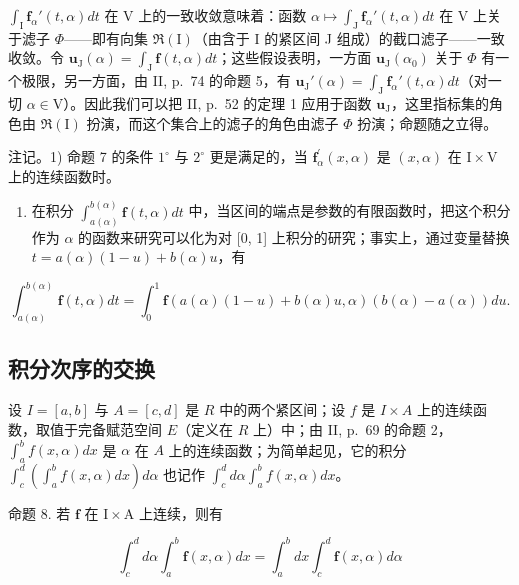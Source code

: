 \(\int_{\mathrm{I}} \mathbf{f}_{\alpha}'(t, \alpha) dt\) 在 V 上的一致收敛意味着：函数 \(\alpha \mapsto \int_{\mathrm{J}} \mathbf{f}_{\alpha}'(t, \alpha) dt\) 在 V 上关于滤子 \(\Phi\)——即有向集 \(\Re(\mathrm{I})\)（由含于 I 的紧区间 J 组成）的截口滤子——一致收敛。令 \(\mathbf{u}_{\mathrm{J}}(\alpha) = \int_{\mathrm{J}} \mathbf{f}(t, \alpha) dt\)；这些假设表明，一方面 \(\mathbf{u}_{\mathrm{J}}(\alpha_0)\) 关于 \(\Phi\) 有一个极限，另一方面，由 II, p.~74 的命题 5，有 \(\mathbf{u}_{\mathrm{J}}'(\alpha) = \int_{\mathrm{J}} \mathbf{f}_{\alpha}'(t, \alpha) dt\)（对一切 \(\alpha \in \mathrm{V}\)）。因此我们可以把 II, p.~52 的定理 1 应用于函数 \(\mathbf{u}_{\mathrm{J}}\)，这里指标集的角色由 \(\Re(\mathrm{I})\) 扮演，而这个集合上的滤子的角色由滤子 \(\Phi\) 扮演；命题随之立得。

注记。1) 命题 7 的条件 \(1^{\circ}\) 与 \(2^{\circ}\) 更是满足的，当 \(\mathbf{f}_{\alpha}^{\prime}(x,\alpha)\) 是 \((x,\alpha)\) 在 \(\mathrm{I} \times \mathrm{V}\) 上的连续函数时。

\begin{enumerate}
\def\labelenumi{\arabic{enumi})}
\setcounter{enumi}{1}
\tightlist
\item
  在积分 \(\int_{a(\alpha)}^{b(\alpha)}\mathbf{f}(t,\alpha)dt\) 中，当区间的端点是参数的有限函数时，把这个积分作为 \(\alpha\) 的函数来研究可以化为对 {[}0, 1{]} 上积分的研究；事实上，通过变量替换 \(t = a(\alpha)(1 - u) + b(\alpha)u\)，有
\end{enumerate}

\[
\int_ {a (\alpha)} ^ {b (\alpha)} \mathbf {f} (t, \alpha) d t = \int_ {0} ^ {1} \mathbf {f} (a (\alpha) (1 - u) + b (\alpha) u, \alpha) (b (\alpha) - a (\alpha)) d u.
\]

\subsection{积分次序的交换}

设 \(I = [a, b]\) 与 \(A = [c, d]\) 是 \(R\) 中的两个紧区间；设 \(f\) 是 \(I \times A\) 上的连续函数，取值于完备赋范空间 \(E\)（定义在 \(R\) 上）中；由 II, p.~69 的命题 2，\(\int_{a}^{b} f(x, \alpha) dx\) 是 \(\alpha\) 在 \(A\) 上的连续函数；为简单起见，它的积分 \(\int_{c}^{d} \left( \int_{a}^{b} f(x, \alpha) dx \right) d\alpha\) 也记作 \(\int_{c}^{d} d\alpha \int_{a}^{b} f(x, \alpha) dx\)。

命题 8. 若 \(\mathbf{f}\) 在 \(\mathrm{I} \times \mathrm{A}\) 上连续，则有

\[
\int_ {c} ^ {d} d \alpha \int_ {a} ^ {b} \mathbf {f} (x, \alpha) d x = \int_ {a} ^ {b} d x \int_ {c} ^ {d} \mathbf {f} (x, \alpha) d \alpha\tag{15}
\]

